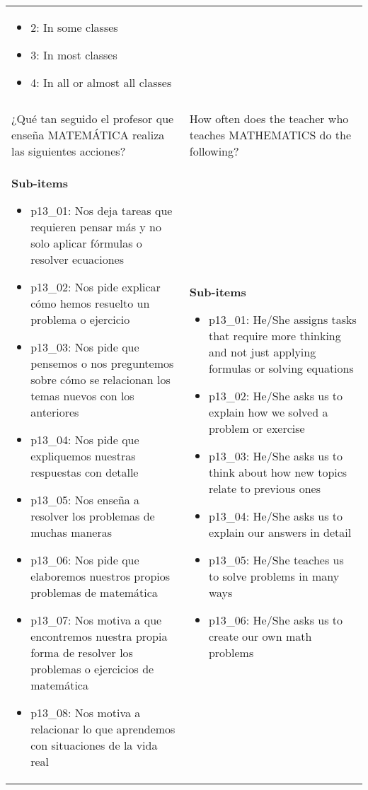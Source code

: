 \documentclass[11pt]{article}
\begin{document}
\begin{longtable}{@{}LL@{}}
\begin{itemize}[leftmargin=*]
\item 2: In some classes
\item 3: In most classes
\item 4: In all or almost all classes\end{itemize} \\
\addlinespace[4pt]
 \\ 
¿Qué tan seguido el profesor que enseña MATEMÁTICA realiza las siguientes acciones? & How often does the teacher who teaches MATHEMATICS do the following? \\
\textbf{Sub-items}\par\begin{itemize}[leftmargin=*]\item p13\_01: Nos deja tareas que requieren pensar más y no solo aplicar fórmulas o resolver ecuaciones
\item p13\_02: Nos pide explicar cómo hemos resuelto un problema o ejercicio
\item p13\_03: Nos pide que pensemos o nos preguntemos sobre cómo se relacionan los temas nuevos con los anteriores
\item p13\_04: Nos pide que expliquemos nuestras respuestas con detalle
\item p13\_05: Nos enseña a resolver los problemas de muchas maneras
\item p13\_06: Nos pide que elaboremos nuestros propios problemas de matemática
\item p13\_07: Nos motiva a que encontremos nuestra propia forma de resolver los problemas o ejercicios de matemática
\item p13\_08: Nos motiva a relacionar lo que aprendemos con situaciones de la vida real\end{itemize} & \textbf{Sub-items}\par\begin{itemize}[leftmargin=*]\item p13\_01: He/She assigns tasks that require more thinking and not just applying formulas or solving equations
\item p13\_02: He/She asks us to explain how we solved a problem or exercise
\item p13\_03: He/She asks us to think about how new topics relate to previous ones
\item p13\_04: He/She asks us to explain our answers in detail
\item p13\_05: He/She teaches us to solve problems in many ways
\item p13\_06: He/She asks us to create our own math problems

\end{itemize}
\end{longtable}
\end{document}
